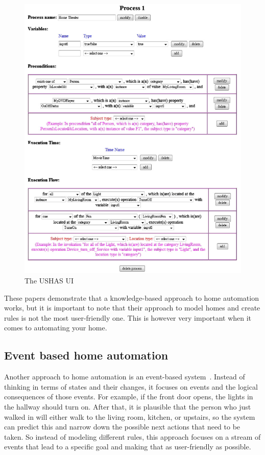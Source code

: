 \documentclass[11pt,a4paper]{report}
\begin{document}
\begin{figure}
    \centering
    \includegraphics[width=0.8\linewidth]{images/USHAS_UI.png}
    \caption{The USHAS UI~\cite{SOTA_AutomationConfigurationSmarthome}}
    \label{fig:USHAS_UI}
\end{figure}

These papers demonstrate that a knowledge-based approach to home automation works, but it is important to note that their approach to model homes and create rules is not the most user-friendly one. This is however very important when it comes to automating your home.

\subsection{Event based home automation}
Another approach to home automation is an event-based system~\cite{SOTA_EventCalculus}. Instead of thinking in terms of states and their changes, it focuses on events and the logical consequences of those events. For example, if the front door opens, the lights in the hallway should turn on. After that, it is plausible that the person who just walked in will either walk to the living room, kitchen, or upstairs, so the system can predict this and narrow down the possible next actions that need to be taken. So instead of modeling different rules, this approach focuses on a stream of events that lead to a specific goal and making that as user-friendly as possible.
\end{document}
